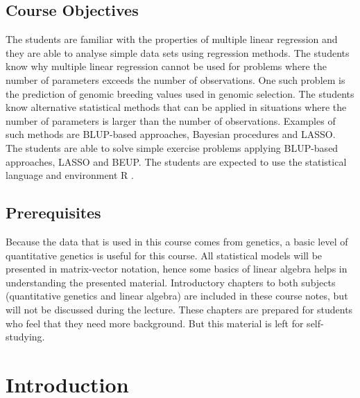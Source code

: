 \documentclass[]{book}
\theoremstyle{definition}
\theoremstyle{definition}
\theoremstyle{definition}
\theoremstyle{remark}
\begin{document}
\hypertarget{course-objectives}{%
\section*{Course Objectives}\label{course-objectives}}

The students are familiar with the properties of multiple linear regression and they are able to analyse simple data sets using regression methods. The students know why multiple linear regression cannot be used for problems where the number of parameters exceeds the number of observations. One such problem is the prediction of genomic breeding values used in genomic selection. The students know alternative statistical methods that can be applied in situations where the number of parameters is larger than the number of observations. Examples of such methods are BLUP-based approaches, Bayesian procedures and LASSO. The students are able to solve simple exercise problems applying BLUP-based approaches, LASSO and BEUP. The students are expected to use the statistical language and environment R \citep{RCoreTeam2018}.

\hypertarget{prerequisites}{%
\section*{Prerequisites}\label{prerequisites}}

Because the data that is used in this course comes from genetics, a basic level of quantitative genetics is useful for this course. All statistical models will be presented in matrix-vector notation, hence some basics of linear algebra helps in understanding the presented material. Introductory chapters to both subjects (quantitative genetics and linear algebra) are included in these course notes, but will not be discussed during the lecture. These chapters are prepared for students who feel that they need more background. But this material is left for self-studying.

\hypertarget{asm-intro}{%
\chapter{Introduction}\label{asm-intro}}
\end{document}
